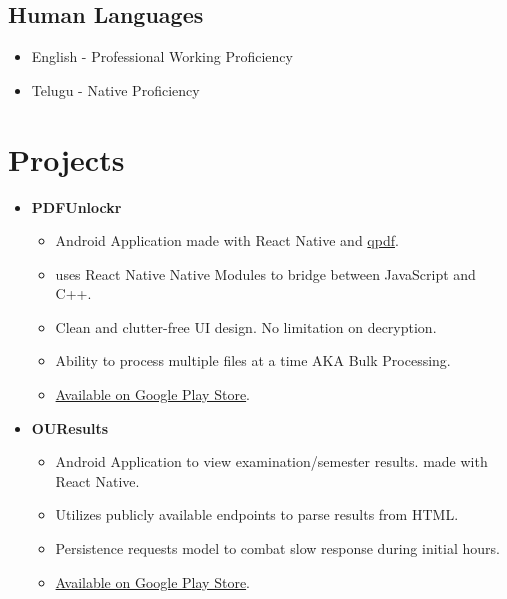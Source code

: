\documentclass{article}
\begin{document}
\subsection{Human Languages}
\begin{itemize}
    \item English - Professional Working Proficiency
    \item Telugu - Native Proficiency
\end{itemize}

\section{Projects}

\begin{itemize}
    \item \textbf{PDFUnlockr}
    \subitem
    \begin{itemize}
        \item Android Application made with React Native and \href{http://qpdf.sourceforge.net/}{qpdf}.
        \item uses React Native Native Modules to bridge between JavaScript and C++.
        \item Clean and clutter-free UI design. No limitation on decryption.
        \item Ability to process multiple files at a time AKA Bulk Processing.
        \item \href{https://play.google.com/store/apps/details?id=com.pdfunlockr}{Available on Google Play Store}.
    \end{itemize}
    
    \item \textbf{OUResults}
    \subitem
    \begin{itemize}
        \item Android Application to view examination/semester results. made with React Native.
        \item Utilizes publicly available endpoints to parse results from HTML.
        \item Persistence requests model to combat slow response during initial hours.
        \item \href{https://play.google.com/store/apps/details?id=com.ouresults}{Available on Google Play Store}.
    \end{itemize}


\end{itemize}
\end{document}
